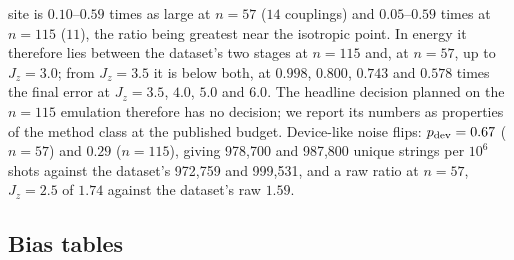 \documentclass[aps,prx,onecolumn,10pt,nofootinbib,longbibliography,floatfix]{revtex4-2}
\theoremstyle{remark}
\newcommand{\Jz}{J_z}
\newcommand{\ms}{m_s}
\begin{document}
site is $0.10$--$0.59$ times as large at $n=57$ ($14$ couplings) and $0.05$--$0.59$ times at $n=115$ ($11$), the %
ratio being greatest near the isotropic point. In energy it therefore lies between the dataset's two stages at
$n=115$ and, at $n=57$, up to $\Jz=3.0$; from $\Jz=3.5$ it is below both, at $0.998$, $0.800$, $0.743$ and $0.578$ %
times the final error at $\Jz=3.5$, $4.0$, $5.0$ and $6.0$. The %
headline decision planned on the $n=115$ emulation therefore has no decision; we report its numbers as properties of %
the method class at the published budget. Device-like noise flips: $p_{\rm dev}=0.67$ ($n=57$) and $0.29$ ($n=115$), %
giving 978,700 and 987,800 unique strings per $10^6$ shots against the dataset's 972,759 and 999,531, and a raw ratio %
at $n=57$, $\Jz=2.5$ of $1.74$ against the dataset's raw $1.59$. %

\needspace{0.7\textheight} %
\subsection{Bias tables}
\def\SMcap{Energy and staggered magnetization of the emulated method class, primary variant (published shot
budget, $1\,\%$ bit flips with recovery; labels of the lowest Rayleigh--Ritz vector). Read along a row: the emulation's %
energy ratio $r=(E-E_0)/(E_1-E_0)$ next to the dataset's (read from its Fig.~2; ``---'': not reported), and the %
reference (DMRG) and emulated $\ms$ with their difference $\Delta\ms$, the signed bias. $D$: number of configurations
in the subspace. At $n=115$ the emulated energy error exceeds the dataset's final one, so these rows describe the method class at %
the published budget, not the dataset's quality.}\def\SMlab{tab:meth_bias_energy}

\end{document}
